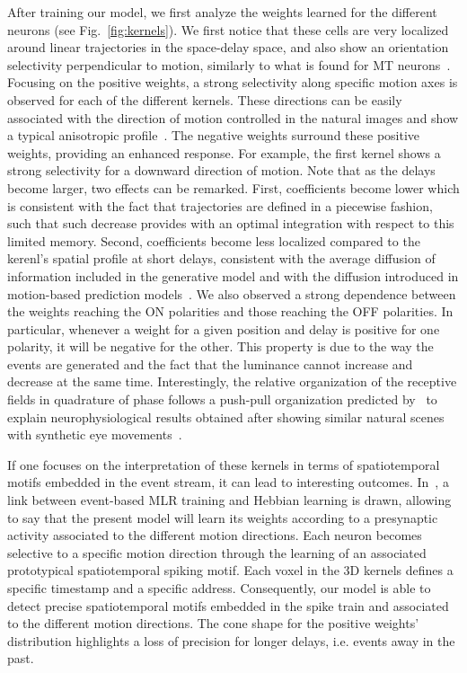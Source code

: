 \documentclass[default]{sn-jnl}%
\theoremstyle{thmstyleone}%
\theoremstyle{thmstyletwo}%
\theoremstyle{thmstylethree}%
\newcommand{\seeFig}[1]{see Fig.~\ref{fig:#1}}%
\begin{document}
%
%
After training our model, we first analyze the weights learned for the different neurons (\seeFig{kernels}). We first notice that these cells are very localized around linear trajectories in the space-delay space, and also show an orientation selectivity perpendicular to motion, similarly to what is found for MT neurons~\citep{deangelis_functional_1999}. Focusing on the positive weights, a strong selectivity along specific motion axes is observed for each of the different kernels. These directions can be easily associated with the direction of motion controlled in the natural images and show a typical anisotropic profile~\citep{kaplan_anisotropic_2013}. The negative weights surround these positive weights, providing an enhanced response. For example, the first kernel shows a strong selectivity for a downward direction of motion. Note that as the delays become larger, two effects can be remarked. First, coefficients become lower which is consistent with the fact that trajectories are defined in a piecewise fashion, such that such decrease provides with an optimal integration with respect to this limited memory. Second, coefficients become less localized compared to the kerenl's spatial profile at short delays, consistent with the average diffusion of information included in the generative model and with the diffusion introduced in motion-based prediction models~\citep{perrinet_motion-based_2012,khoei_flash-lag_2017}. We also observed a strong dependence between the weights reaching the ON polarities and those reaching the OFF polarities. In particular, whenever a weight for a given position and delay is positive for one polarity, it will be negative for the other. This property is due to the way the events are generated and the fact that the luminance cannot increase and decrease at the same time.  Interestingly, the relative organization of the receptive fields in quadrature of phase follows a push-pull organization predicted by~\citet{kremkow_push-pull_2016} to explain neurophysiological results obtained after showing similar natural scenes with synthetic eye movements~\citep{baudot_animation_2013}.

If one focuses on the interpretation of these kernels in terms of spatiotemporal motifs embedded in the event stream, it can lead to interesting outcomes. In~\citep{grimaldi_robust_2022}, a link between event-based MLR training and Hebbian learning is drawn, allowing to say that the present model will learn its weights according to a presynaptic activity associated to the different motion directions. Each neuron becomes selective to a specific motion direction through the learning of an associated prototypical spatiotemporal spiking motif. Each voxel in the 3D kernels defines a specific timestamp and a specific address. Consequently, our model is able to detect precise spatiotemporal motifs embedded in the spike train and associated to the different motion directions. The cone shape for the positive weights' distribution highlights a loss of precision for longer delays, i.e. events away in the past. 
%
%
\end{document}
